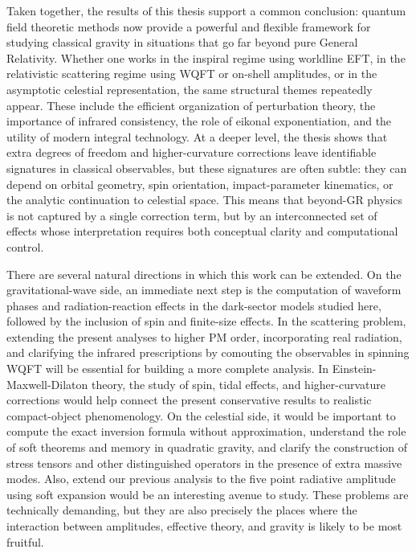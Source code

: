 \documentclass[11pt,a4paper,oneside]{book}
\begin{document}
Taken together, the results of this thesis support a common conclusion: quantum field theoretic methods now provide a powerful and flexible framework for studying classical gravity in situations that go far beyond pure General Relativity. Whether one works in the inspiral regime using worldline EFT, in the relativistic scattering regime using WQFT or on-shell amplitudes, or in the asymptotic celestial representation, the same structural themes repeatedly appear. These include the efficient organization of perturbation theory, the importance of infrared consistency, the role of eikonal exponentiation, and the utility of modern integral technology. At a deeper level, the thesis shows that extra degrees of freedom and higher-curvature corrections leave identifiable signatures in classical observables, but these signatures are often subtle: they can depend on orbital geometry, spin orientation, impact-parameter kinematics, or the analytic continuation to celestial space. This means that beyond-GR physics is not captured by a single correction term, but by an interconnected set of effects whose interpretation requires both conceptual clarity and computational control.

There are several natural directions in which this work can be extended. On the gravitational-wave side, an immediate next step is the computation of waveform phases and radiation-reaction effects in the dark-sector models studied here, followed by the inclusion of spin and finite-size effects. In the scattering problem, extending the present analyses to higher PM order, incorporating real radiation, and clarifying the infrared prescriptions by comouting the observables in spinning WQFT will be essential for building a more complete analysis. In Einstein-Maxwell-Dilaton theory, the study of spin, tidal effects, and higher-curvature corrections would help connect the present conservative results to realistic compact-object phenomenology. On the celestial side, it would be important to compute the exact inversion formula without approximation, understand the role of soft theorems and memory in quadratic gravity, and clarify the construction of stress tensors and other distinguished operators in the presence of extra massive modes. Also, extend our previous analysis to the five point radiative amplitude using soft expansion would be an interesting avenue to study. These problems are technically demanding, but they are also precisely the places where the interaction between amplitudes, effective theory, and gravity is likely to be most fruitful.
\end{document}
